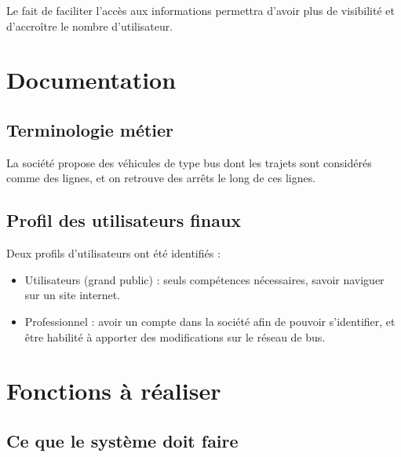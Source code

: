 \documentclass[french]{article}
\begin{document}
Le fait de faciliter l'accès aux informations permettra d'avoir plus de visibilité et d'accroître le nombre d'utilisateur.

\section{Documentation}

\subsection{Terminologie métier}

La société propose des véhicules de type bus dont les trajets sont considérés comme des lignes, et on retrouve des arrêts le long de ces lignes.

\subsection{Profil des utilisateurs finaux}

Deux profils d’utilisateurs ont été identifiés :
\begin{itemize}
    \item Utilisateurs (grand public) : seuls compétences nécessaires, savoir naviguer sur un site internet.
    \item Professionnel :  avoir un compte dans la société afin de pouvoir s’identifier,  et être habilité à apporter des modifications sur le réseau de bus.
\end{itemize}

\section{Fonctions à réaliser}

\subsection{Ce que le système doit faire}
\end{document}
